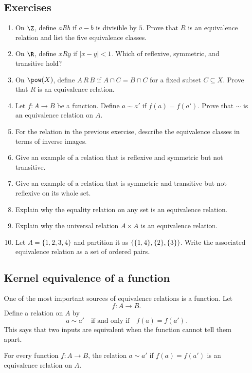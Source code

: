 \subsection{Exercises}

\begin{enumerate}
\item On $\Z$, define $aRb$ if $a-b$ is divisible by $5$. Prove that $R$ is an equivalence relation and list the five equivalence classes.
\item On $\R$, define $xRy$ if $|x-y|<1$. Which of reflexive, symmetric, and transitive hold?
\item On $\pow(X)$, define $A\,R\,B$ if $A\cap C=B\cap C$ for a fixed subset $C\subseteq X$. Prove that $R$ is an equivalence relation.
\item Let $f:A\to B$ be a function. Define $a\sim a'$ if $f(a)=f(a')$. Prove that $\sim$ is an equivalence relation on $A$.
\item For the relation in the previous exercise, describe the equivalence classes in terms of inverse images.
\item Give an example of a relation that is reflexive and symmetric but not transitive.
\item Give an example of a relation that is symmetric and transitive but not reflexive on its whole set.
\item Explain why the equality relation on any set is an equivalence relation.
\item Explain why the universal relation $A\times A$ is an equivalence relation.
\item Let $A=\{1,2,3,4\}$ and partition it as $\{\{1,4\},\{2\},\{3\}\}$. Write the associated equivalence relation as a set of ordered pairs.
\end{enumerate}

\subsection{Kernel equivalence of a function}

One of the most important sources of equivalence relations is a function. Let
\[
f:A\to B.
\]
Define a relation on $A$ by
\[
a\sim a'\quad\text{if and only if}\quad f(a)=f(a').
\]
This says that two inputs are equivalent when the function cannot tell them apart.

\begin{theorem}
For every function $f:A\to B$, the relation $a\sim a'$ if $f(a)=f(a')$ is an equivalence relation on $A$.
\end{theorem}

